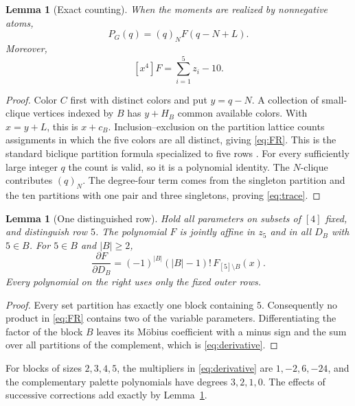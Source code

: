 \documentclass[11pt,a4paper]{article}
\newtheorem{lemma}[theorem]{Lemma}
\theoremstyle{definition}
\newcommand{\fall}[2]{(#1)_{#2}}
\begin{document}
\begin{lemma}[Exact counting]\label{lem:count}
When the moments are realized by nonnegative atoms,
\begin{equation}\label{eq:count}
 P_G(q)=\fall qN F(q-N+L).
\end{equation}
Moreover,
\begin{equation}\label{eq:trace}
 [x^4]F=\sum_{i=1}^5z_i-10.
\end{equation}
\end{lemma}
\begin{proof}
Color $C$ first with distinct colors and put $y=q-N$.
A collection of small-clique vertices indexed by $B$ has $y+H_B$
common available colors. With $x=y+L$, this is $x+c_B$.
Inclusion--exclusion on the partition lattice counts assignments in which
the five colors are all distinct, giving \eqref{eq:FR}. This is the standard
biclique partition formula specialized to five rows
\cite[Proposition 9]{CM}. For every sufficiently large integer $q$ the
count is valid, so it is a polynomial identity. The $N$-clique contributes
$\fall qN$.
The degree-four term comes from the singleton partition and the ten
partitions with one pair and three singletons, proving \eqref{eq:trace}.
\end{proof}

\begin{lemma}[One distinguished row]\label{lem:affine}
Hold all parameters on subsets of $[4]$ fixed, and distinguish row $5$.
The polynomial $F$ is jointly affine in $z_5$ and in all $D_B$ with
$5\in B$. For $5\in B$ and $|B|\ge2$,
\begin{equation}\label{eq:derivative}
 \frac{\partial F}{\partial D_B}
 =(-1)^{|B|}(|B|-1)!\,F_{[5]\setminus B}(x).
\end{equation}
Every polynomial on the right uses only the fixed outer rows.
\end{lemma}
\begin{proof}
Every set partition has exactly one block containing $5$.
Consequently no product in \eqref{eq:FR} contains two of the variable
parameters. Differentiating the factor of the block $B$ leaves its
Möbius coefficient with a minus sign and the sum over all partitions of
the complement, which is \eqref{eq:derivative}.
\end{proof}

For blocks of sizes $2,3,4,5$, the multipliers in
\eqref{eq:derivative} are $1,-2,6,-24$, and the complementary palette
polynomials have degrees $3,2,1,0$. The effects of successive corrections
add exactly by Lemma~\ref{lem:affine}.
\end{document}
